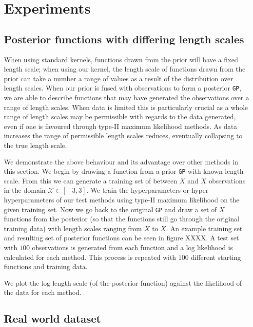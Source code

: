 \documentclass{article}
\begin{document}
\section{Experiments}



\subsection{Posterior functions with differing length scales}

When using standard kernels, functions drawn from the prior will have a fixed length scale; when using our kernel, the length scale of functions drawn from the prior can take a number a range of values as a result of the distribution over length scales. When our prior is fused with observations to form a posterior \verb"GP", we are able to describe functions that may have generated the observations over a range of length scales. When data is limited this is particularly crucial as a whole range of length scales may be permissible with regards to the data generated, even if one is favoured through type-II maximum likelihood methods. As data increases the range of permissible length scales reduces, eventually collapsing to the true length scale.

We demonstrate the above behaviour and its advantage over other methods in this section. We begin by drawing a function from a prior \verb"GP" with known length scale. From this we can generate a training set of between $X$ and $X$ observations in the domain $\mathcal{X}\in [-3,3]$. We train the hyperparameters or hyper-hyperparameters of our test methods using type-II maximum likelihood on the given training set. Now we go back to the original \verb"GP" and draw a set of $X$ functions from the posterior (so that the functions still go through the original training data) with length scales ranging from $X$ to $X$. An example training set and resulting set of posterior functions can be seen in figure XXXX. A test set with $100$ observations is generated from each function and a log likelihood is calculated for each method. This process is repeated with $100$ different starting functions and training data.

We plot the log length scale (of the posterior function) against the likelihood of the data for each method.





\subsection{Real world dataset}
\end{document}
